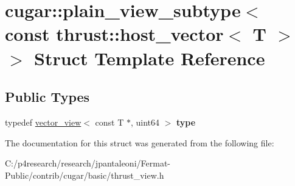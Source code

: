\hypertarget{structcugar_1_1plain__view__subtype_3_01const_01thrust_1_1host__vector_3_01_t_01_4_01_4}{}\section{cugar\+:\+:plain\+\_\+view\+\_\+subtype$<$ const thrust\+:\+:host\+\_\+vector$<$ T $>$ $>$ Struct Template Reference}
\label{structcugar_1_1plain__view__subtype_3_01const_01thrust_1_1host__vector_3_01_t_01_4_01_4}
\subsection*{Public Types}
\begin{DoxyCompactItemize}
\item 
\mbox{\label{structcugar_1_1plain__view__subtype_3_01const_01thrust_1_1host__vector_3_01_t_01_4_01_4_ac6ab03084b3b95ef486df59fa23240f6}} 
typedef \hyperlink{structcugar_1_1vector__view}{vector\+\_\+view}$<$ const T $\ast$, uint64 $>$ {\bfseries type}
\end{DoxyCompactItemize}


The documentation for this struct was generated from the following file\+:\begin{DoxyCompactItemize}
\item 
C\+:/p4research/research/jpantaleoni/\+Fermat-\/\+Public/contrib/cugar/basic/thrust\+\_\+view.\+h\end{DoxyCompactItemize}
